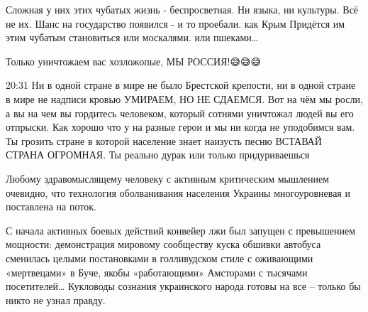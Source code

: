 
Сложная у них этих чубатых жизнь - беспросветная.
Ни языка, ни культуры. Всё не их.
Шанс на государство появился - и то проебали. как Крым
Придётся им этим чубатым становиться или москалями. или пшеками…

Только уничтожаем вас хозложопые, МЫ РОССИЯ!😅😅😅

20:31
Ни в одной стране в мире не было Брестской крепости, ни в одной стране в мире
не надписи кровью УМИРАЕМ, НО НЕ СДАЕМСЯ. Вот на чём мы росли, а вы на чем вы
гордитесь человеком, который сотнями уничтожал людей вы его отпрыски. Как
хорошо что у на разные герои и мы ни когда не уподобимся вам. Ты грозить стране
в которой население знает наизусть песню ВСТАВАЙ СТРАНА ОГРОМНАЯ. Ты реально
дурак или только придуриваешься


Любому здравомыслящему человеку с активным критическим мышлением очевидно, что
технология оболванивания населения Украины многоуровневая и поставлена на
поток.

С начала активных боевых действий конвейер лжи был запущен с превышением
мощности: демонстрация мировому сообществу куска обшивки автобуса сменилась
целыми постановками в голливудском стиле с оживающими «мертвецами» в Буче,
якобы «работающими» Амсторами с тысячами посетителей… Кукловоды сознания
украинского народа готовы на все – только бы никто не узнал правду.

